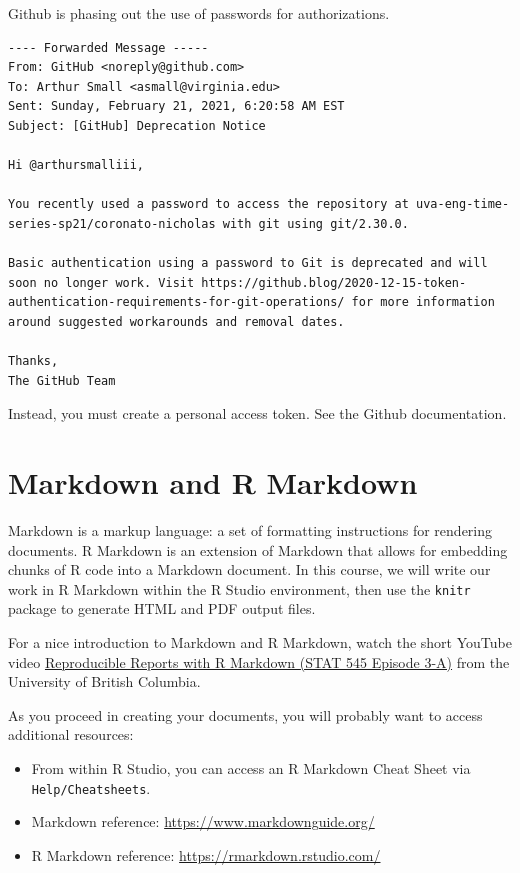 \documentclass[
]{book}
\begin{document}
Github is phasing out the use of passwords for authorizations.

\begin{verbatim}
---- Forwarded Message -----
From: GitHub <noreply@github.com>
To: Arthur Small <asmall@virginia.edu>
Sent: Sunday, February 21, 2021, 6:20:58 AM EST
Subject: [GitHub] Deprecation Notice

Hi @arthursmalliii,

You recently used a password to access the repository at uva-eng-time-series-sp21/coronato-nicholas with git using git/2.30.0.

Basic authentication using a password to Git is deprecated and will soon no longer work. Visit https://github.blog/2020-12-15-token-authentication-requirements-for-git-operations/ for more information around suggested workarounds and removal dates.

Thanks,
The GitHub Team
\end{verbatim}

Instead, you must create a personal access token. See the Github documentation.

\hypertarget{markdown-and-r-markdown}{%
\section{Markdown and R Markdown}\label{markdown-and-r-markdown}}

Markdown is a markup language: a set of formatting instructions for rendering documents. R Markdown is an extension of Markdown that allows for embedding chunks of R code into a Markdown document. In this course, we will write our work in R Markdown within the R Studio environment, then use the \texttt{knitr} package to generate HTML and PDF output files.

For a nice introduction to Markdown and R Markdown, watch the short YouTube video \href{https://www.youtube.com/watch?v=ZzDSkBgt9xQ}{Reproducible Reports with R Markdown (STAT 545 Episode 3-A)} from the University of British Columbia.

As you proceed in creating your documents, you will probably want to access additional resources:

\begin{itemize}
\item
  From within R Studio, you can access an R Markdown Cheat Sheet via \texttt{Help/Cheatsheets}.
\item
  Markdown reference: \url{https://www.markdownguide.org/}
\item
  R Markdown reference: \url{https://rmarkdown.rstudio.com/}
\end{itemize}
\end{document}
